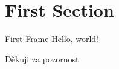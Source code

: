 \documentclass[14pt]{beamer}
\title{\makebox[\linewidth]{Robotika jednoduše}}
\date{\today}
\author{Tomáš Sláma}
\institute{Gymnázium Turnov}
\begin{document}
  \maketitle

  \section{First Section}

  \begin{frame}{First Frame}
    Hello, world!
  \end{frame}

  {
  \begin{frame}[standout]
    Děkuji za pozornost
  \end{frame}
  }
\end{document}
